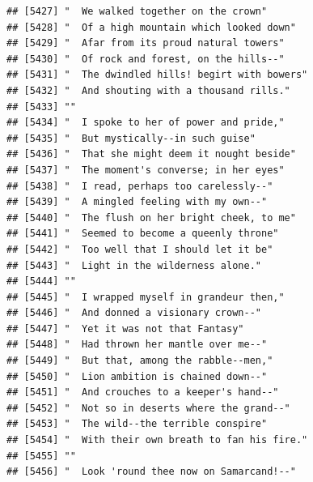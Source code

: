 \documentclass{article}\usepackage[]{graphicx}\usepackage[]{color}
\makeatletter
\newenvironment{kframe}{%
 \def\at@end@of@kframe{}%
 \ifinner\ifhmode%
  \def\at@end@of@kframe{\end{minipage}}%
  \begin{minipage}{\columnwidth}%
 \fi\fi%
 \def\FrameCommand##1{\hskip\@totalleftmargin \hskip-\fboxsep
 \colorbox{shadecolor}{##1}\hskip-\fboxsep
     \hskip-\linewidth \hskip-\@totalleftmargin \hskip\columnwidth}%
 \MakeFramed {\advance\hsize-\width
   \@totalleftmargin\z@ \linewidth\hsize
   \@setminipage}}%
 {\par\unskip\endMakeFramed%
 \at@end@of@kframe}
\newenvironment{knitrout}{}{} %
\makeatother
\begin{document}
\begin{knitrout}
\begin{kframe}
\begin{verbatim}
## [5427] "  We walked together on the crown"                                           
## [5428] "  Of a high mountain which looked down"                                      
## [5429] "  Afar from its proud natural towers"                                        
## [5430] "  Of rock and forest, on the hills--"                                        
## [5431] "  The dwindled hills! begirt with bowers"                                    
## [5432] "  And shouting with a thousand rills."                                       
## [5433] ""                                                                            
## [5434] "  I spoke to her of power and pride,"                                        
## [5435] "  But mystically--in such guise"                                             
## [5436] "  That she might deem it nought beside"                                      
## [5437] "  The moment's converse; in her eyes"                                        
## [5438] "  I read, perhaps too carelessly--"                                          
## [5439] "  A mingled feeling with my own--"                                           
## [5440] "  The flush on her bright cheek, to me"                                      
## [5441] "  Seemed to become a queenly throne"                                         
## [5442] "  Too well that I should let it be"                                          
## [5443] "  Light in the wilderness alone."                                            
## [5444] ""                                                                            
## [5445] "  I wrapped myself in grandeur then,"                                        
## [5446] "  And donned a visionary crown--"                                            
## [5447] "  Yet it was not that Fantasy"                                               
## [5448] "  Had thrown her mantle over me--"                                           
## [5449] "  But that, among the rabble--men,"                                          
## [5450] "  Lion ambition is chained down--"                                           
## [5451] "  And crouches to a keeper's hand--"                                         
## [5452] "  Not so in deserts where the grand--"                                       
## [5453] "  The wild--the terrible conspire"                                           
## [5454] "  With their own breath to fan his fire."                                    
## [5455] ""                                                                            
## [5456] "  Look 'round thee now on Samarcand!--"                                      

\end{verbatim}
\end{kframe}
\end{knitrout}
\end{document}
